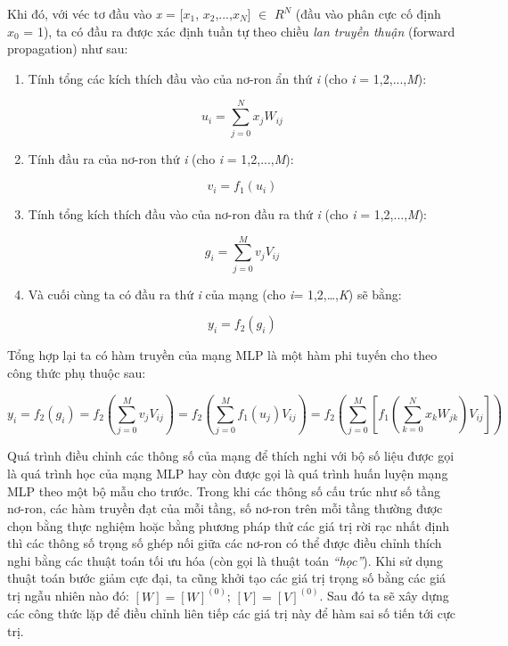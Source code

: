 Khi đó, với véc tơ đầu vào \textit{x} = [$x_{1}$, $x_{2}$,...,$x_{N}$] $\in$ $R^{N}$ (đầu vào phân cực cố định $x_{0}$ = 1), ta có đầu ra được xác định tuần tự theo chiều \textit{lan truyền thuận} (forward propagation) như sau:

\begin{enumerate}
\item Tính tổng các kích thích đầu vào của nơ-ron ẩn thứ \textit{i} (cho \textit{i} = 1,2,...,\textit{M}):

\begin{equation}
\label{eq:1}
u_{i} = \sum_{j=0}^{N}x_{j}W_{ij}
\tag{1}
\end{equation}

\item Tính đầu ra của nơ-ron thứ \textit{i} (cho \textit{i} = 1,2,...,\textit{M}):

\begin{equation}
\label{eq:2}
v_{i} = f_{1}(u_{i})
\tag{2}
\end{equation}

\item Tính tổng kích thích đầu vào của nơ-ron đầu ra thứ \textit{i} (cho \textit{i} = 1,2,...,\textit{M}):

\begin{equation}
\label{eq:3}
g_{i} = \sum_{j=0}^{M}v_{j}V_{ij}
\tag{3}
\end{equation}

\item Và cuối cùng ta có đầu ra thứ \textit{i} của mạng (cho \textit{i}= 1,2,…,\textit{K}) sẽ bằng:

\begin{equation}
\label{eq:4}
y_{i} = f_{2}(g_{i})
\tag{4}
\end{equation}

\end{enumerate}

Tổng hợp lại ta có hàm truyền của mạng MLP là một hàm phi tuyến cho theo công thức phụ thuộc sau:

\begin{equation}
\label{eq:5}
y_{i} = f_{2}(g_{i}) = f_{2}\left ( \sum_{j=0}^{M}v_{j}V_{ij} \right ) = f_{2}\left ( \sum_{j=0}^{M}f_{1}(u_{j})V_{ij} \right ) = f_{2}\left ( \sum_{j=0}^{M}\left [ f_{1}\left ( \sum_{k=0}^{N}x_{k}W_{jk} \right )V_{ij} \right ] \right )
\tag{5}
\end{equation}

Quá trình điều chỉnh các thông số của mạng để thích nghi với bộ số liệu được gọi là quá trình học của mạng MLP hay còn được gọi là quá trình huấn luyện mạng MLP theo một bộ mẫu cho trước. Trong khi các thông số cấu trúc như số tầng nơ-ron, các hàm truyền đạt của mỗi tầng, số nơ-ron trên mỗi tầng thường được chọn bằng thực nghiệm hoặc bằng phương pháp thử các giá trị rời rạc nhất định thì các thông số trọng số ghép nối giữa các nơ-ron có thể được điều chỉnh thích nghi bằng các thuật toán tối ưu hóa (còn gọi là thuật toán \textit{“học”}). Khi sử dụng thuật toán bước giảm cực đại, ta cũng khởi tạo các giá trị trọng số bằng các giá trị ngẫu nhiên nào đó: $[W]=[W]^{(0)}$; $[V]=[V]^{(0)}$. Sau đó ta sẽ xây dựng các công thức lặp để điều chỉnh liên tiếp các giá trị này để hàm sai số tiến tới cực trị.

